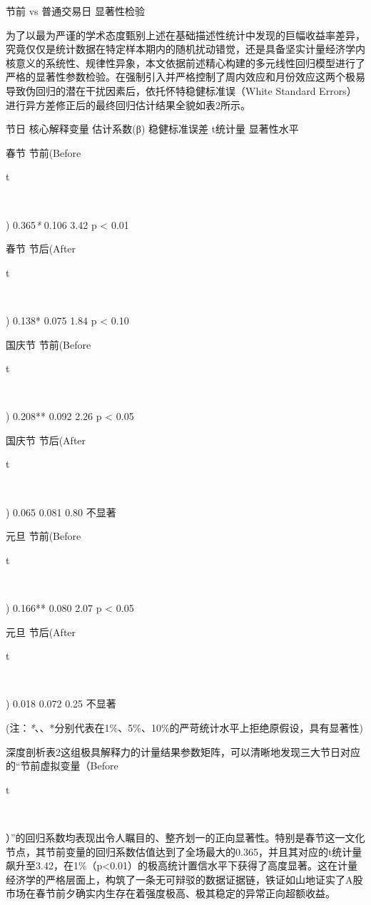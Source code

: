 \documentclass{cupb-thesis}
\begin{document}
节前 vs 普通交易日 显著性检验

为了以最为严谨的学术态度甄别上述在基础描述性统计中发现的巨幅收益率差异，究竟仅仅是统计数据在特定样本期内的随机扰动错觉，还是具备坚实计量经济学内核意义的系统性、规律性异象，本文依据前述精心构建的多元线性回归模型进行了严格的显著性参数检验。在强制引入并严格控制了周内效应和月份效应这两个极易导致伪回归的潜在干扰因素后，依托怀特稳健标准误（White Standard Errors）进行异方差修正后的最终回归估计结果全貌如表2所示。


节日	核心解释变量	估计系数(β)	稳健标准误差	t统计量	显著性水平

春节	节前(Before

t

​

)	0.365\textit{*}	0.106	3.42	p < 0.01

春节	节后(After

t

​

)	0.138*	0.075	1.84	p < 0.10

国庆节	节前(Before

t

​

)	0.208**	0.092	2.26	p < 0.05

国庆节	节后(After

t

​

)	0.065	0.081	0.80	不显著

元旦	节前(Before

t

​

)	0.166**	0.080	2.07	p < 0.05

元旦	节后(After

t

​

)	0.018	0.072	0.25	不显著

(注：\textit{*}、、*分别代表在1\%、5\%、10\%的严苛统计水平上拒绝原假设，具有显著性)


深度剖析表2这组极具解释力的计量结果参数矩阵，可以清晰地发现三大节日对应的“节前虚拟变量（Before

t

​

）”的回归系数均表现出令人瞩目的、整齐划一的正向显著性。特别是春节这一文化节点，其节前变量的回归系数估值达到了全场最大的0.365，并且其对应的t统计量飙升至3.42，在1\%（p<0.01）的极高统计置信水平下获得了高度显著。这在计量经济学的严格层面上，构筑了一条无可辩驳的数据证据链，铁证如山地证实了A股市场在春节前夕确实内生存在着强度极高、极其稳定的异常正向超额收益。
\end{document}
